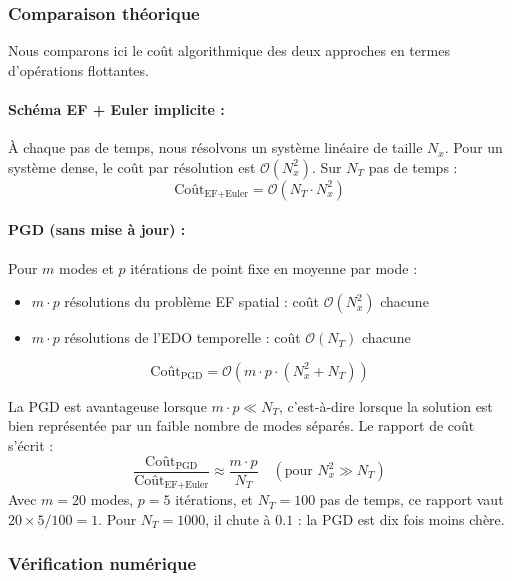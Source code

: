 \documentclass[11pt,a4paper]{article}
\begin{document}
\subsubsection{Comparaison théorique}

Nous comparons ici le coût algorithmique des deux approches en termes
d'opérations flottantes.

\paragraph{Schéma EF + Euler implicite :}
À chaque pas de temps, nous résolvons un système linéaire de taille $N_x$.
Pour un système dense, le coût par résolution est $\mathcal{O}(N_x^2)$.
Sur $N_T$ pas de temps :
\begin{equation}
    \text{Coût}_{\text{EF+Euler}} = \mathcal{O}(N_T \cdot N_x^2)
\end{equation}

\paragraph{PGD (sans mise à jour) :}
Pour $m$ modes et $p$ itérations de point fixe en moyenne par mode :
\begin{itemize}
    \item $m \cdot p$ résolutions du problème EF spatial : coût $\mathcal{O}(N_x^2)$ chacune
    \item $m \cdot p$ résolutions de l'EDO temporelle : coût $\mathcal{O}(N_T)$ chacune
\end{itemize}
\begin{equation}
    \text{Coût}_{\text{PGD}} = \mathcal{O}\!\left(m \cdot p \cdot (N_x^2 + N_T)\right)
\end{equation}

La PGD est avantageuse lorsque $m \cdot p \ll N_T$, c'est-à-dire lorsque la solution
est bien représentée par un faible nombre de modes séparés.
Le rapport de coût s'écrit :
\begin{equation}
    \frac{\text{Coût}_{\text{PGD}}}{\text{Coût}_{\text{EF+Euler}}}
    \approx \frac{m \cdot p}{N_T}
    \quad (\text{pour } N_x^2 \gg N_T)
\end{equation}
Avec $m = 20$ modes, $p = 5$ itérations, et $N_T = 100$ pas de temps,
ce rapport vaut $20 \times 5 / 100 = 1$.
Pour $N_T = 1000$, il chute à $0.1$ : la PGD est dix fois moins chère.

\subsubsection{Vérification numérique}
\end{document}
